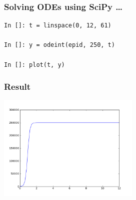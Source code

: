 \documentclass[14pt,compress]{beamer}
\begin{document}
\begin{frame}[fragile]
\frametitle{Solving ODEs using SciPy \ldots}
\begin{lstlisting}
In []: t = linspace(0, 12, 61)

In []: y = odeint(epid, 250, t)

In []: plot(t, y)
\end{lstlisting}
\end{frame}

\begin{frame}[fragile]
\frametitle{Result}
\begin{center}
    \includegraphics[height=2in, interpolate=true]{data/population_ode}
\end{center}
\end{frame}
\end{document}

